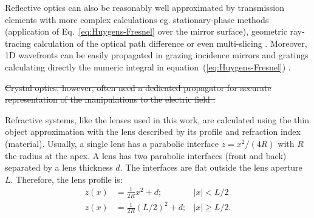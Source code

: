 \documentclass{iucr}              %
\newcommand{\todo}[1]{{\color{red}[TODO: "#1'']}}
\newcommand{\remove}[1]{ {\color{blue} \sout{#1}}}
\newcommand{\inblue}[1]{{\color{blue}#1}}
\begin{document}
Reflective optics can also be reasonably well approximated by transmission elements with more complex calculations eg. stationary-phase methods (application of Eq.~\ref{eq:Huygens-Fresnel} over the mirror surface), geometric ray-tracing calculation of the optical path difference \cite{Canestrari2014} or even multi-slicing \cite{Li2017}. 
\inblue{Moreover, 1D wavefronts can be easily propagated in grazing incidence mirrors and gratings calculating directly the numeric integral in equation~(\ref{eq:Huygens-Fresnel}) \cite{wiser2015,srioLBL}. }

\remove{Crystal optics, however, often need a dedicated propagator for accurate representation of the manipulations to the electric field \cite{Sutter2014, Sutter2020}.}

\inblue{Refractive systems, like the lenses used in this work, are calculated using the thin object approximation with the lens described by its profile and refraction index (material). Usually, a single lens has a parabolic interface $z=x^2/(4R)$ with $R$ the radius at the apex. A lens has two parabolic interfaces (front and back) separated by a lens thickness $d$. The interfaces are flat outside the lens aperture $L$. Therefore, the lens profile is:
\begin{align}
    z(x) &= \frac{1}{2R} x^2 + d; & |x| < L/2\\ \nonumber
    z(x) &= \frac{1}{2R} (L/2)^2 + d; & |x| \ge L/2.
\end{align}
}



\end{document}
